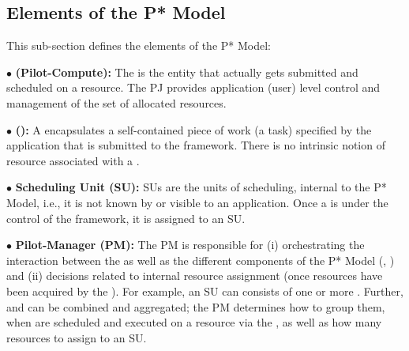 \documentclass{sig-alternate}
\begin{document}
%

\noindent 
\subsection{Elements of the P* Model}


\noindent This sub-section defines the elements of the P* Model:


\noindent$\bullet$ \textbf{\pilot (Pilot-Compute):} The \pilot is the
  entity that actually gets submitted and scheduled on a resource.
  The PJ provides application (user)
  level control and management of the set of allocated resources.



\noindent$\bullet$ \textbf{\computeunit  (\cu):} A \cu  encapsulates a 
  self-contained piece of work (a task) specified by the application that is
  submitted to the \pilotjob framework. There is no intrinsic notion
  of resource associated with a \cu.

\noindent$\bullet$ \textbf{Scheduling Unit (SU):} SUs are the units of 
  scheduling, internal to the P* Model, i.e., it is not known by or
  visible to an application. Once a \cu is
  under the control of the \pilotjob framework, it is assigned
  to an SU.

\noindent$\bullet$ \textbf{Pilot-Manager (PM):} The PM is responsible for (i)
  orchestrating the interaction between the \pilots as well as the
  different components of the P* Model (\cus, \sus) and (ii) decisions
  related to internal resource assignment (once resources have been
  acquired by the \pilotjob).  For example, an SU can consists of one
  or more \cus. Further, \cus and \sus can be combined and aggregated;
  the PM determines how to group them, when \sus are scheduled and
  executed on a resource via the \pilot, as well as how many resources
  to assign to an SU.
\end{document}

